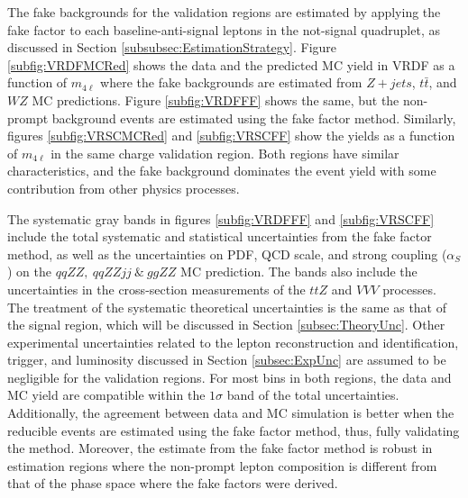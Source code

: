 The fake backgrounds for the validation regions are estimated by applying the fake factor to each baseline-anti-signal leptons in the not-signal quadruplet, as discussed in Section \ref{subsubsec:EstimationStrategy}. Figure \ref{subfig:VRDFMCRed} shows the data and the predicted MC yield in VRDF as a function of $m_{4\ell}$ where the fake backgrounds are estimated from $Z+jets$, $t\bar{t}$, and $WZ$ MC predictions. Figure \ref{subfig:VRDFFF} shows the same, but the non-prompt background events are estimated using the fake factor method. Similarly, figures \ref{subfig:VRSCMCRed} and \ref{subfig:VRSCFF} show the yields as a function of $m_{4\ell}$ in the same charge validation region. Both regions have similar characteristics, and the fake background dominates the event yield with some contribution from other physics processes.

The systematic gray bands in figures \ref{subfig:VRDFFF} and \ref{subfig:VRSCFF} include the total systematic and statistical uncertainties from the fake factor method, as well as the uncertainties on PDF, QCD scale, and strong coupling ($\alpha_{S}$) on the $qqZZ,~qqZZjj~\&~ggZZ$ MC prediction. The bands also include the uncertainties in the cross-section measurements of the $ttZ$ and $VVV$ processes. The treatment of the systematic theoretical uncertainties is the same as that of the signal region, which will be discussed in Section \ref{subsec:TheoryUnc}. Other experimental uncertainties related to the lepton reconstruction and identification, trigger, and luminosity discussed in Section \ref{subsec:ExpUnc} are assumed to be negligible for the validation regions. For most bins in both regions, the data and MC yield are compatible within the $1\sigma$ band of the total uncertainties. Additionally, the agreement between data and MC simulation is better when the reducible events are estimated using the fake factor method, thus, fully validating the method. Moreover, the estimate from the fake factor method is robust in estimation regions where the non-prompt lepton composition is different from that of the phase space where the fake factors were derived.

